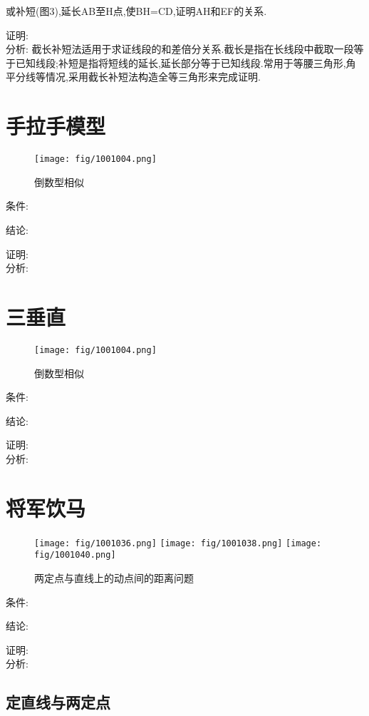 \documentclass[cn,blue,10pt]{elegantbook}
\begin{document}
或补短(图3),延长AB至H点,使BH=CD,证明AH和EF的关系.

证明:\\

分析: 截长补短法适用于求证线段的和差倍分关系.截长是指在长线段中截取一段等于已知线段;补短是指将短线的延长,延长部分等于已知线段.常用于等腰三角形,角平分线等情况,采用截长补短法构造全等三角形来完成证明.

\section{手拉手模型}%
\label{sec:手拉手模型}

\begin{figure}[h]
    \centering
    \texttt{[image: fig/1001004.png]}
    \caption{倒数型相似}%
    \label{fig:倒数型相似}
\end{figure}
条件: \(\) 

结论: \( \) 

证明:\\

分析: 
\section{三垂直}%
\label{sec:三垂直}

\begin{figure}[h]
    \centering
    \texttt{[image: fig/1001004.png]}
    \caption{倒数型相似}%
    \label{fig:倒数型相似}
\end{figure}
条件: \(\) 

结论: \( \) 

证明:\\

分析: 
\section{将军饮马}%
\label{sec:将军饮马}

\begin{figure}[H]
    \centering
    \texttt{[image: fig/1001036.png]}
    \texttt{[image: fig/1001038.png]}
    \texttt{[image: fig/1001040.png]}
    \caption{两定点与直线上的动点间的距离问题}%
    \label{fig:倒数型相似}
\end{figure}
条件: \(\) 

结论: \( \) 

证明:\\

分析: 
\subsection{定直线与两定点}%
\label{sub:定直线与两定点}
\end{document}
